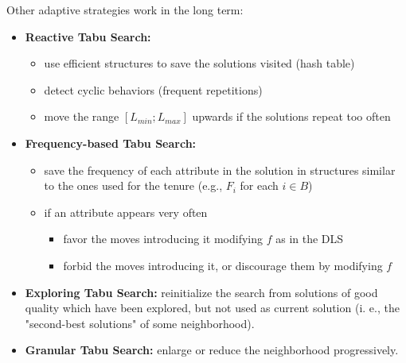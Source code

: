 Other adaptive strategies work in the long term:
\begin{itemize}
	\item \textbf{Reactive Tabu Search:}
	\begin{itemize}
		\item use efficient structures to save the solutions visited (hash table)
		\item detect cyclic behaviors (frequent repetitions)
		\item move the range $[L_{min}; L_{max}]$ upwards if the solutions repeat too often
	\end{itemize}
	\nn
	
	\item \textbf{Frequency-based Tabu Search:}
	\begin{itemize}
		\item save the frequency of each attribute in the solution in structures similar to the ones used for the tenure (e.g., $F_i$ for each $i \in B$)
		\item if an attribute appears very often
		\begin{itemize}
			\item favor the moves introducing it modifying $f$ as in the DLS
			\item forbid the moves introducing it, or discourage them by modifying $f$
		\end{itemize}
	\end{itemize}
	\nn
	
	\item \textbf{Exploring Tabu Search:} reinitialize the search from solutions of good quality which have been explored, but not used as current solution (i. e., the "second-best solutions" of some neighborhood).\\
	
	\item \textbf{Granular Tabu Search:} enlarge or reduce the neighborhood progressively.\\
\end{itemize}


\newpage